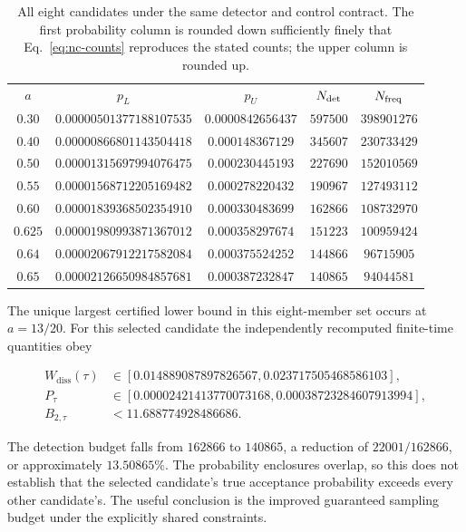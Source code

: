 \documentclass[aps,pra,reprint,superscriptaddress,longbibliography]{revtex4-2}
\newcommand{\Wd}{W_{\mathrm{diss}}}
\begin{document}
\begin{table}[t]
\caption{All eight candidates under the same detector and control
contract.  The first probability column is rounded down sufficiently
finely that Eq.~\eqref{eq:nc-counts} reproduces the stated counts;
the upper column is rounded up.}
\label{tab:nc-design}
\begin{ruledtabular}
\begin{tabular}{ccccc}
$a$&$p_L$&$p_U$&$N_{\rm det}$&$N_{\rm freq}$\\
$0.30$&$0.00000501377188107535$&$0.0000842656437$&$597500$&$398901276$\\
$0.40$&$0.00000866801143504418$&$0.000148367129$&$345607$&$230733429$\\
$0.50$&$0.00001315697994076475$&$0.000230445193$&$227690$&$152010569$\\
$0.55$&$0.00001568712205169482$&$0.000278220432$&$190967$&$127493112$\\
$0.60$&$0.00001839368502354910$&$0.000330483699$&$162866$&$108732970$\\
$0.625$&$0.00001980993871367012$&$0.000358297674$&$151223$&$100959424$\\
$0.64$&$0.00002067912217582084$&$0.000375524252$&$144866$&$96715905$\\
$0.65$&$0.00002126650984857681$&$0.000387232847$&$140865$&$94044581$
\end{tabular}
\end{ruledtabular}
\end{table}

The unique largest certified lower bound in this eight-member set
occurs at $a=13/20$.  For this selected candidate the independently
recomputed finite-time quantities obey
\begin{widetext}
\begin{align}
 \Wd(\tau)&\in[0.014889087897826567,0.023717505468586103],
 \nonumber\\
 P_\tau&\in[0.00002421413770073168,0.00038723284607913994],
 \nonumber\\
 B_{2,\tau}&<11.688774928486686.
 \label{eq:nc-selected}
\end{align}
\end{widetext}
The detection budget falls from $162866$ to $140865$, a reduction
of $22001/162866$, or approximately $13.50865\%$.
The probability enclosures overlap, so this does not establish that
the selected candidate's true acceptance probability exceeds every
other candidate's.  The useful conclusion is the improved guaranteed
sampling budget under the explicitly shared constraints.
\end{document}
